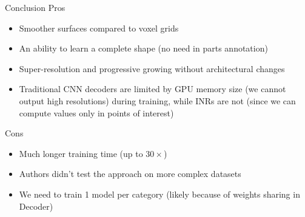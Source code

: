 \documentclass[handout, 10pt]{beamer}
\begin{document}
\begin{frame}{Conclusion}
Pros
\begin{itemize}
    \item\pause Smoother surfaces compared to voxel grids
    \item\pause An ability to learn a complete shape (no need in parts annotation)
    \item\pause Super-resolution and progressive growing without architectural changes
    \item\pause Traditional CNN decoders are limited by GPU memory size (we cannot output high resolutions) during training, while INRs are not (since we can compute values only in points of interest)
\end{itemize}

Cons
\begin{itemize}
    \item\pause Much longer training time (up to $30\times$)
    \item\pause Authors didn't test the approach on more complex datasets
    \item\pause We need to train 1 model per category (likely because of weights sharing in Decoder)
\end{itemize}
\end{frame}
\end{document}
